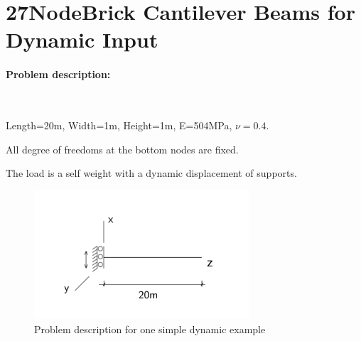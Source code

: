 \documentclass[fleqn,11pt]{article}
\begin{document}
























\section{27NodeBrick Cantilever Beams for Dynamic Input}



\paragraph{Problem description:} ~



Length=20m, Width=1m, Height=1m, E=504MPa, $\nu=0.4$. 

All degree of freedoms at the bottom nodes are fixed. 

The load is a self weight with a dynamic displacement of supports.


\begin{figure}[!htb]
  \centering
  \includegraphics[width=8cm]{../Figure-files/_Chapter_Appendix_Illustrative_Examples/dynamic_example_diagram.pdf}
  \caption{Problem description for one simple dynamic example}
  \label{fig Problem description for one simple dynamic example}
\end{figure}
\end{document}
